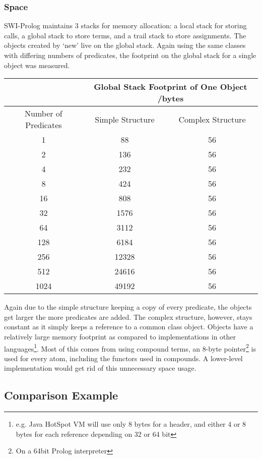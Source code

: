 \documentclass[12pt,a4paper,twoside,openright]{report}
\begin{document}
\subsubsection{Space}

SWI-Prolog maintains 3 stacks for memory allocation: a local stack for storing calls, a global stack to store terms, and a trail stack to store assignments. The objects created by `new' live on the global stack. Again using the same classes with differing numbers of predicates, the footprint on the global stack for a single object was measured.

\begin{center}
\begin{tabular}{c|c|c}

& \multicolumn{2}{c}{Global Stack Footprint of One Object /bytes} \\
\hline
Number of Predicates & Simple Structure & Complex Structure \\
\hline
1		&	88		&	56	\\
2		&	136		&	56	\\
4		&	232		&	56	\\
8		&	424		&	56	\\
16		&	808		&	56	\\
32		&	1576	&	56	\\
64		&	3112	&	56	\\
128		&	6184	&	56	\\
256		&	12328	&	56	\\
512		&	24616	&	56	\\
1024	&	49192	&	56	\\


\end{tabular}
\end{center}

\noindent Again due to the simple structure keeping a copy of every predicate, the objects get larger the more predicates are added. The complex structure, however, stays constant as it simply keeps a reference to a common class object. Objects have a relatively large memory footprint as compared to implementations in other languages\footnote{e.g. Java HotSpot VM will use only 8 bytes for a header, and either 4 or 8 bytes for each reference depending on 32 or 64 bit}. Most of this comes from using compound terms, an 8-byte pointer\footnote{On a 64bit Prolog interpreter} is used for every atom, including the functors used in compounds. A lower-level implementation would get rid of this unnecessary space usage.

\subsection{Comparison Example}
\end{document}
